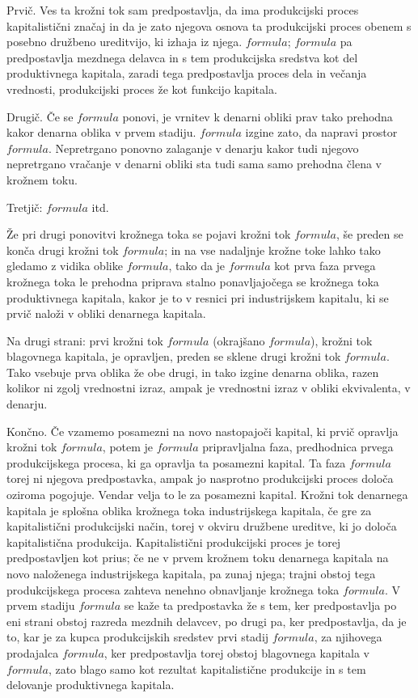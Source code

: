 \documentclass[kapital_02.tex]{subfiles}
\begin{document}
Prvič. Ves ta krožni tok sam predpostavlja, da ima produkcijski proces kapitalistični značaj in da je zato njegova osnova ta produkcijski proces obenem s posebno družbeno ureditvijo, ki izhaja iz njega. \( formula \); \( formula \) pa predpostavlja mezdnega delavca in s tem produkcijska sredstva kot del produktivnega kapitala, zaradi tega predpostavlja proces dela in večanja vrednosti, produkcijski proces že kot funkcijo kapitala.

Drugič. Če se \( formula \) ponovi, je vrnitev k denarni obliki prav tako prehodna kakor denarna oblika v prvem stadiju. \( formula \) izgine zato, da napravi prostor \( formula \). Nepretrgano ponovno zalaganje v denarju kakor tudi njegovo nepretrgano vračanje v denarni obliki sta tudi sama samo prehodna člena v krožnem toku.

Tretjič: \( formula \) itd.

Že pri drugi ponovitvi krožnega toka se pojavi krožni tok \( formula \), še preden se konča drugi krožni tok \( formula \); in na vse nadaljnje krožne toke lahko tako gledamo z vidika oblike \( formula \), tako da je \( formula \) kot prva faza prvega krožnega toka le prehodna priprava stalno ponavljajočega se krožnega toka produktivnega kapitala, kakor je to v resnici pri industrijskem kapitalu, ki se prvič naloži v obliki denarnega kapitala.

Na drugi strani: prvi krožni tok \( formula \) (okrajšano \( formula \)), krožni tok blagovnega kapitala, je opravljen, preden se sklene drugi krožni tok \( formula \). Tako vsebuje prva oblika že obe drugi, in tako izgine denarna oblika, razen kolikor ni zgolj vrednostni izraz, ampak je vrednostni izraz v obliki ekvivalenta, v denarju.

Končno. Če vzamemo posamezni na novo nastopajoči kapital, ki prvič opravlja krožni tok \( formula \), potem je \( formula \) pripravljalna faza, predhodnica prvega produkcijskega procesa, ki ga opravlja ta posamezni kapital. Ta faza \( formula \) torej ni njegova predpostavka, ampak jo nasprotno produkcijski proces določa oziroma pogojuje. Vendar velja to le za posamezni kapital. Krožni tok denarnega kapitala je splošna oblika krožnega toka industrijskega kapitala, če gre za kapitalistični produkcijski način, torej v okviru družbene ureditve, ki jo določa kapitalistična produkcija. Kapitalistični produkcijski proces je torej predpostavljen kot prius; če ne v prvem krožnem toku denarnega kapitala na novo naloženega industrijskega kapitala, pa zunaj njega; trajni obstoj tega produkcijskega procesa zahteva nenehno obnavljanje krožnega toka \( formula \). V prvem stadiju \( formula \) se kaže ta predpostavka že s tem, ker predpostavlja po eni strani obstoj razreda mezdnih delavcev, po drugi pa, ker predpostavlja, da je to, kar je za kupca produkcijskih sredstev prvi stadij \( formula \), za njihovega prodajalca \( formula \), ker predpostavlja torej obstoj blagovnega kapitala v \( formula \), zato blago samo kot rezultat kapitalistične produkcije in s tem delovanje produktivnega kapitala.
\end{document}
